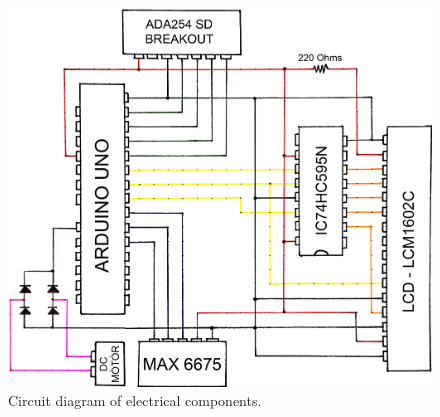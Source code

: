     \begin{figure}[H]
        \centering
        \includegraphics[width=\textwidth]{diagrams/circuit}
        \caption[Circuit diagram]{Circuit diagram of electrical components.}
        \label{fig:circuit}
    \end{figure}